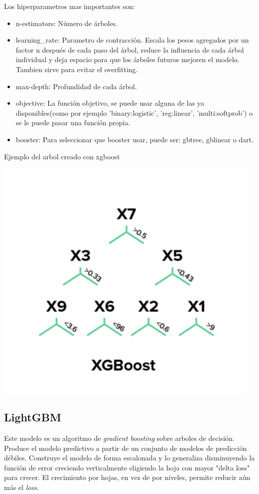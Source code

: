 \documentclass[12pt,a4paper]{article}
\begin{document}
Los hiperparametros mas importantes son:
 \begin{itemize}
    \item n-estimators: Número de árboles.
    
    \item learning\_rate: Parametro de contracción. Escala los pesos agregados por un factor n  después de cada paso del árbol, reduce la influencia de cada árbol individual y deja espacio para que los  árboles futuros mejoren el modelo. Tambien sirve para evitar el overfitting.
    
    \item max-depth: Profundidad de cada árbol.
    
    \item objective: La función objetivo, se puede usar alguna de las ya disponibles(como por ejemplo 'binary:logistic', 'reg:linear', 'multi:softprob') o se le puede pasar una función propia.
    
    \item booster: Para seleccionar que booster usar, puede ser: gbtree, gblinear o dart.
    
\end{itemize}

Ejemplo del arbol creado con xgboost
\begin{center}
    \includegraphics[scale=0.5]{imgs/xgb.png}
\end{center}


\subsection{LightGBM}
Este modelo es un algoritmo de \textit{gradient boosting} sobre arboles de decisión.
Produce el modelo predictivo a partir de un conjunto de modelos de predicción débiles. Construye el modelo de forma escalonada y lo generaliza disminuyendo la función de error creciendo verticalmente eligiendo la hoja con mayor "delta loss" para crecer. El crecimiento por hojas, en vez de por niveles, permite reducir aún más el \textit{loss}.
\end{document}
